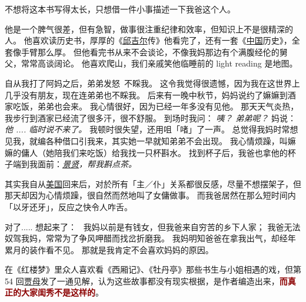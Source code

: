 \documentclass[12pt]{report}
\newcommand{\cc}[2]{#1}
\newcommand{\cc}[2]{#2}
\newcommand{\speechCn}[1]{\textrm{\textit{\textcolor{Speech}{#1}}}}
\renewcommand{\em}[1]{\textbf{\textcolor{DarkRed}{#1}}}
\begin{document}
\cc{
不想将这本书写得太长，只想借一件小事描述一下我爸这个人。
}{
	
}

\cc{
他是一个脾气很差，但有急智，做事很注重纪律和效率，但知识上不是很精深的人。  他喜欢读历史书，厚厚的《\uline{邱吉尔}传》他看完了，还有一套《\uline{中国}历史》，全套像手臂那么厚。  但他看完书从来不会谈论，不像我妈那边有个满腹经伦的舅父，常常高谈阔论。 他喜欢爬山，我们亲戚笑他临睡前的 light reading 是地图。
}{
	
}

\cc{
自从我打了阿妈之后，弟弟发怒~不睬我。 这令我觉得很遗憾，因为我在这世界上几乎没有朋友，现在连弟弟也不睬我。 后来有一晚中秋节，妈妈说约了嫲嫲到酒家吃饭，弟弟也会来。  我心情很好，因为已经一年多没有见他。  那天天气炎热，我步行到酒家已经流了很多汗，很不舒服。 到场时我问： \speechCn{咦？ 弟弟呢？}  妈说： \speechCn{他 .... 临时说不来了。}  我顿时很失望，还用咀「啫」了一声。  总觉得我妈时常想见我，就编各种借口引我来，其实她一早就知弟弟不会出现。 我心情烦躁，叫嫲嫲的傭人（她陪我们来吃饭）给我找一只杯斟水。 找到杯子后，我爸也拿他的杯子端到我面前：\speechCn{\uline{景贤}，帮我斟点茶。}
}{
	
}

\cc{
其实我自从\uline{美国}回来后，对於所有「主／仆」关系都很反感，尽量不想摆架子，但那天却因为心情烦躁，很自然而然地叫了女傭做事。  而我爸居然在那么短时间内「以牙还牙」，反应之快令人咋舌。
}{
	
}

\cc{
对了..... 想起来了：~ 我妈以前是有钱女，但我爸来自穷苦的乡下人家； 我爸无法奴驾我妈，常常为了争风呷醋而找岔折磨我。  我妈明知爸爸在拿我出气，却经年累月的装作看不见。  那就是我肯定不会喜欢妈妈的原因。
}{
	
}

\cc{
在《红楼梦》里众人喜欢看《西厢记》、《牡丹亭》那些书生与小姐相遇的戏，但第 54 回\uline{贾母}发了一通见解，认为这些故事都没有现实根据，是作者编造出来，\em{而真正的大家闺秀不是这样的}。
}{
	
}
\end{document}
